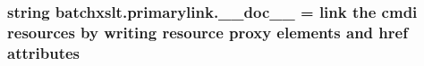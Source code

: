 \subsubsection[{\+\_\+\+\_\+doc\+\_\+\+\_\+}]{\setlength{\rightskip}{0pt plus 5cm}string batchxslt.\+primarylink.\+\_\+\+\_\+doc\+\_\+\+\_\+ = \textquotesingle{}link the cmdi resources by writing resource proxy elements and href attributes\textquotesingle{}}\label{namespacebatchxslt_1_1primarylink_aa78a3782fe90770d3785ae6c9bcb0e91}
